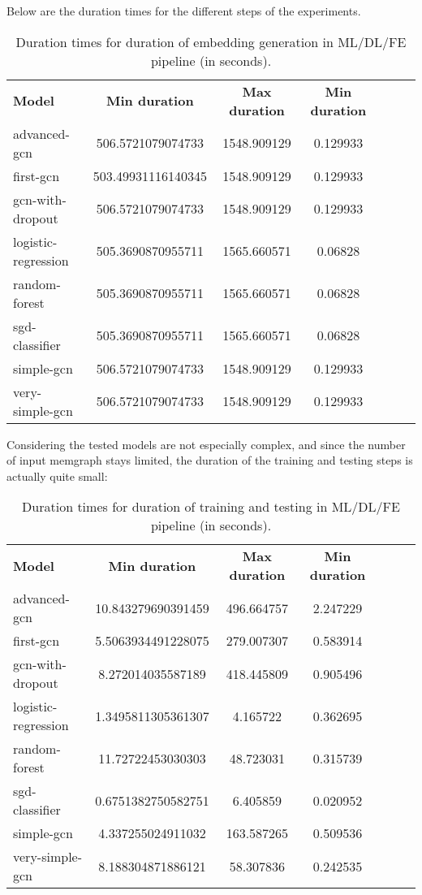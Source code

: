 Below are the duration times for the different steps of the experiments.

\begin{table}[H]
    \centering
    \caption{Duration times for duration of embedding generation in ML/DL/FE pipeline (in seconds).}
    \begin{tabular}{lcccccc}
      \textbf{Model}  & \textbf{Min duration} & \textbf{Max duration} & \textbf{Min duration} \\
        advanced-gcn & 506.5721079074733 & 1548.909129 & 0.129933 \\
        first-gcn & 503.49931116140345 & 1548.909129 & 0.129933 \\
        gcn-with-dropout & 506.5721079074733 & 1548.909129 & 0.129933 \\
        logistic-regression & 505.3690870955711 & 1565.660571 & 0.06828 \\
        random-forest & 505.3690870955711 & 1565.660571 & 0.06828 \\
        sgd-classifier & 505.3690870955711 & 1565.660571 & 0.06828 \\
        simple-gcn & 506.5721079074733 & 1548.909129 & 0.129933 \\
        very-simple-gcn & 506.5721079074733 & 1548.909129 & 0.129933 \\
    \end{tabular}
\end{table}

Considering the tested models are not especially complex, and since the number of input memgraph stays limited, the duration of the training and testing steps is actually quite small:

\begin{table}[H]
    \centering
    \caption{Duration times for duration of training and testing in ML/DL/FE pipeline (in seconds).}
    \begin{tabular}{lcccccc}
      \textbf{Model}  & \textbf{Min duration} & \textbf{Max duration} & \textbf{Min duration} \\
        advanced-gcn & 10.843279690391459 & 496.664757 & 2.247229 \\
        first-gcn & 5.5063934491228075 & 279.007307 & 0.583914 \\
        gcn-with-dropout & 8.272014035587189 & 418.445809 & 0.905496 \\
        logistic-regression & 1.3495811305361307 & 4.165722 & 0.362695 \\
        random-forest & 11.72722453030303 & 48.723031 & 0.315739 \\
        sgd-classifier & 0.6751382750582751 & 6.405859 & 0.020952 \\
        simple-gcn & 4.337255024911032 & 163.587265 & 0.509536 \\
        very-simple-gcn & 8.188304871886121 & 58.307836 & 0.242535 \\
    \end{tabular}
\end{table}

